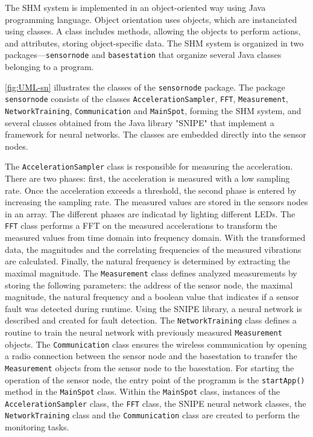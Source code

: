 \documentclass[12pt,a4paper]{scrartcl}
\begin{document}
The SHM system is implemented in an object-oriented way using Java programming language. 
Object orientation uses objects, which are instanciated using classes. 
A class includes methods, allowing the objects to perform actions, and attributes, storing object-specific data.
The SHM system is organized in two packages---\texttt{sensornode} and \texttt{basestation} that organize several Java classes belonging to a program.

\autoref{fig:UML-sn} illustrates the classes of the \texttt{sensor\-node} package.
The package \texttt{sensor\-node} consists of the classes \texttt{Acceleration\-Sampler}, \texttt{FFT}, \texttt{Measure\-ment}, \texttt{Network\-Training}, \texttt{Communi\-cation} and \texttt{Main\-Spot}, forming the SHM system, and several classes obtained from the Java library "SNIPE" \citep{SNIPE} that implement a framework for neural networks.
The classes are embedded directly into the sensor nodes.

The \texttt{Acceleration\-Sampler} class is responsible for measuring the acceleration.
There are two phases: first, the acceleration is measured with a low sampling rate.
Once the acceleration exceeds a threshold, the second phase is entered by increasing the sampling rate. 
The measured values are stored in the sensors nodes in an array.
The different phases are indicatad by lighting different LEDs.
The \texttt{FFT} class performs a FFT on the measured accelerations to transform the measured values from time domain into frequency domain. 
With the transformed data, the magnitudes and the correlating frequencies of the measured vibrations are calculated.
Finally, the natural frequency is determined by extracting the maximal magnitude.
The \texttt{Measure\-ment} class defines analyzed measurements by storing the following parameters: the address of the sensor node, the maximal magnitude, the natural frequency and a boolean value that indicates if a sensor fault was detected during runtime.
Using the SNIPE library, a neural network is described and created for fault detection.
The \texttt{Network\-Training} class defines a routine to train the neural network with previously measured \texttt{Measure\-ment} objects.
The \texttt{Communi\-cation} class ensures the wireless communication by opening a radio connection between the sensor node and the basestation to transfer the \texttt{Measure\-ment} objects from the sensor node to the basestation.
For starting the operation of the sensor node, the entry point of the programm is the \texttt{start\-App()} method in the \texttt{Main\-Spot} class. 
Within the \texttt{Main\-Spot} class, instances of the \texttt{Acceleration\-Sampler} class, the \texttt{FFT} class, the SNIPE neural network classes, the \texttt{Network\-Training} class and the \texttt{Communi\-cation} class are created to perform the monitoring tasks.
\end{document}

